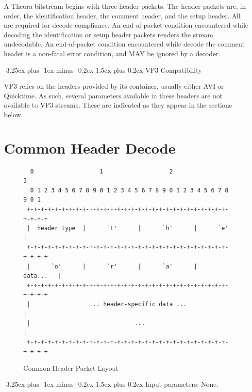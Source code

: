\documentclass[9pt,letterpaper]{book}
\makeatletter
\numberwithin{equation}{chapter}
\numberwithin{figure}{chapter}
\numberwithin{table}{chapter}
\renewcommand{\paragraph}{\@startsection{paragraph}{4}{0ex}%
 {-3.25ex plus -1ex minus -0.2ex}%
 {1.5ex plus 0.2ex}%
 {\normalfont\normalsize\bfseries}}
\makeatother
\begin{document}
A Theora bitstream begins with three header packets.
The header packets are, in order, the identification header, the comment
 header, and the setup header.
All are required for decode compliance.
An end-of-packet condition encountered while decoding the identification or
 setup header packets renders the stream undecodable.
An end-of-packet condition encountered while decode the comment header is a
 non-fatal error condition, and MAY be ignored by a decoder.

\paragraph{VP3 Compatibility}

VP3 relies on the headers provided by its container, usually either AVI or
 Quicktime.
As such, several parameters available in these headers are not available to VP3
 streams.
These are indicated as they appear in the sections below.

\section{Common Header Decode}
\label{sub:common-header}

\begin{figure}[H]
\begin{center}
\begin{verbatim}
  0                   1                   2                   3   
  0 1 2 3 4 5 6 7 8 9 0 1 2 3 4 5 6 7 8 9 0 1 2 3 4 5 6 7 8 9 0 1 
 +-+-+-+-+-+-+-+-+-+-+-+-+-+-+-+-+-+-+-+-+-+-+-+-+-+-+-+-+-+-+-+-+
 |  header type  |      `t'      |      `h'      |      `e'      |
 +-+-+-+-+-+-+-+-+-+-+-+-+-+-+-+-+-+-+-+-+-+-+-+-+-+-+-+-+-+-+-+-+
 |      `o'      |      `r'      |      `a'      |     data...   |
 +-+-+-+-+-+-+-+-+-+-+-+-+-+-+-+-+-+-+-+-+-+-+-+-+-+-+-+-+-+-+-+-+
 |                 ... header-specific data ...                  |
 |                              ...                              |
 +-+-+-+-+-+-+-+-+-+-+-+-+-+-+-+-+-+-+-+-+-+-+-+-+-+-+-+-+-+-+-+-+
\end{verbatim}
\end{center}
\caption{Common Header Packet Layout}
\label{fig:commonheader}
\end{figure}


\paragraph{Input parameters:} None.
\end{document}
